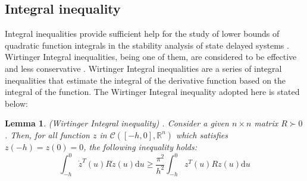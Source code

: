 \documentclass[a4paper]{cas-sc}
\newtheorem{lemma}[theorem]{Lemma}
\begin{document}
\subsection{Integral inequality}
\label{Section 2.2}

Integral inequalities provide sufficient help for the study of lower bounds of quadratic function integrals in the stability analysis of state delayed systems \citep{martyniuk_integral_1979,zhang_stability_2016,li_uniform_2021}. Wirtinger Integral inequalities, being one of them, are considered to be effective and less conservative \citep{saravanan_finite-time_2021,suresh_robust_2021}. Wirtinger Integral inequalities are a series of integral inequalities that estimate the integral of the derivative function based on the integral of the function. The Wirtinger Integral inequality adopted here is stated below:
\begin{lemma}
  \label{lemma1}
  (Wirtinger Integral inequality) \citep{park_stability_2015}. Consider a given $ n \times n $ matrix $ R \succ 0 $. Then, for all function $z$ in $ \mathcal{C}\left( {\left[ { - h,0} \right],{\mathbb{R}^n}} \right) $ which satisfies $ z( - h) = z(0) = 0 $, the following inequality holds:
  \begin{equation}
    \int_{ - h}^0 {{{\dot z}^T}} (u)R\dot z(u){\text{d}}u \geqslant \frac{{{\pi ^2}}}{{{h^2}}}\int_{ - h}^0 {{z^T}} (u)Rz(u){\text{d}}u
    \label{eqlemma1}
  \end{equation}
\end{lemma}
\end{document}
